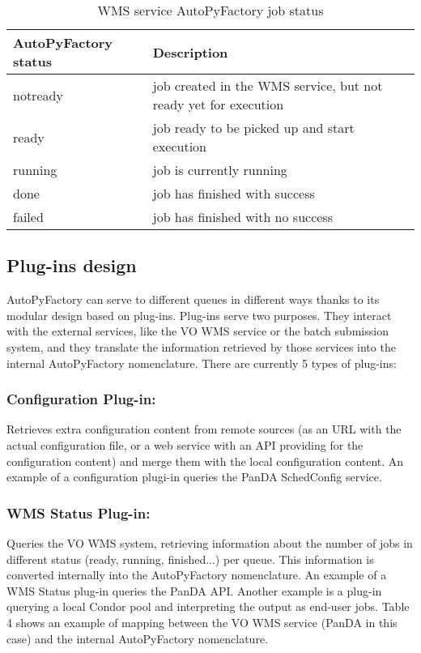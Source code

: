 \documentclass[a4paper]{jpconf}
\begin{document}
\begin{table}
   \begin{center}
      \begin{tabular}{l l}
         \hline
         \textbf{AutoPyFactory status} & \textbf{Description} \\
         \hline
         notready &     job created in the WMS service, but not ready yet for execution\\ 
         ready    &     job ready to be picked up and start execution                  \\ 
         running  &     job is currently running                                       \\ 
         done     &     job has finished with success                                  \\ 
         failed   &     job has finished with no success                               \\ 
         \hline
      \end{tabular}
   \end{center}
   \caption{WMS service AutoPyFactory job status}
   \label{wms job status}
\end{table}

\subsection{Plug-ins design}

AutoPyFactory can serve to different queues in different ways 
thanks to its modular design based on plug-ins. 
Plug-ins serve two purposes. 
They interact with the external services, like the VO WMS service or the batch submission system,
and they translate the information retrieved by those services into the internal AutoPyFactory nomenclature.
There are currently 5 types of plug-ins:


\subsubsection{Configuration Plug-in:}

Retrieves extra configuration content from remote sources 
(as an URL with the actual configuration file, or a web service with an API providing for the configuration content)
and merge them with the local configuration content.
An example of a configuration plugi-in queries the PanDA SchedConfig service.


\subsubsection{WMS Status Plug-in: }
Queries the VO WMS system, 
retrieving information about the number of jobs in different status (ready, running, finished...) per queue.
This information is converted internally into the AutoPyFactory nomenclature.
An example of a WMS Status plug-in queries the PanDA API.
Another example is a plug-in querying a local Condor pool and interpreting the output as end-user jobs.
Table 4 shows an example of mapping between the VO WMS service 
(PanDA in this case)
and the internal AutoPyFactory nomenclature.
\end{document}
